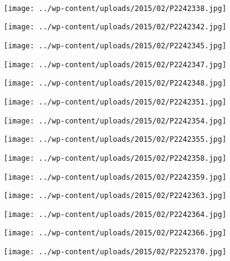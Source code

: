\pagebreak
~\\
\begin{center} \texttt{[image: ../wp-content/uploads/2015/02/P2242338.jpg]} \end{center}
\begin{center} \texttt{[image: ../wp-content/uploads/2015/02/P2242342.jpg]} \end{center}
\begin{center} \texttt{[image: ../wp-content/uploads/2015/02/P2242345.jpg]} \end{center}
\begin{center} \texttt{[image: ../wp-content/uploads/2015/02/P2242347.jpg]} \end{center}
\begin{center} \texttt{[image: ../wp-content/uploads/2015/02/P2242348.jpg]} \end{center}
\begin{center} \texttt{[image: ../wp-content/uploads/2015/02/P2242351.jpg]} \end{center}
\begin{center} \texttt{[image: ../wp-content/uploads/2015/02/P2242354.jpg]} \end{center}
\begin{center} \texttt{[image: ../wp-content/uploads/2015/02/P2242355.jpg]} \end{center}
\begin{center} \texttt{[image: ../wp-content/uploads/2015/02/P2242358.jpg]} \end{center}
\begin{center} \texttt{[image: ../wp-content/uploads/2015/02/P2242359.jpg]} \end{center}
\begin{center} \texttt{[image: ../wp-content/uploads/2015/02/P2242363.jpg]} \end{center}
\begin{center} \texttt{[image: ../wp-content/uploads/2015/02/P2242364.jpg]} \end{center}
\begin{center} \texttt{[image: ../wp-content/uploads/2015/02/P2242366.jpg]} \end{center}
\vfill
\begin{center} \texttt{[image: ../wp-content/uploads/2015/02/P2252370.jpg]} \end{center}
\vspace{-\topsep}
\vspace{-0.75mm}

